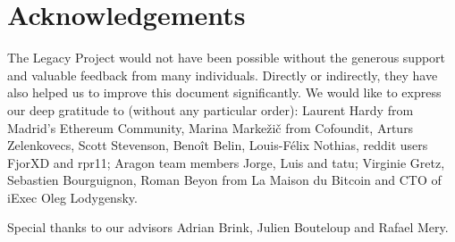 \chapter*{Acknowledgements}

The Legacy Project would not have been possible without the generous support and valuable feedback from many individuals.
Directly or indirectly, they have also helped us to improve this document significantly.
We would like to express our deep gratitude to (without any particular order):
Laurent Hardy from Madrid's Ethereum Community, Marina Markežič from Cofoundit, Arturs Zelenkovecs, Scott Stevenson, Benoît Belin, Louis-Félix Nothias, reddit users FjorXD and rpr11; Aragon team members Jorge, Luis and tatu; Virginie Gretz, Sebastien Bourguignon, Roman Beyon from La Maison du Bitcoin and CTO of iExec Oleg Lodygensky.

\vspace{2mm}

Special thanks to our advisors Adrian Brink, Julien Bouteloup and Rafael Mery.


